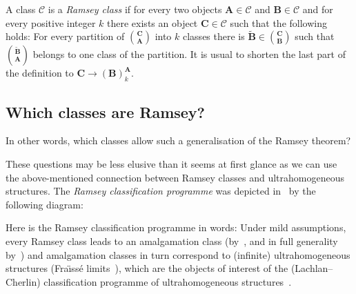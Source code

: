 \documentclass{elsarticle}
\def\str#1{\mathbf {#1}}
\def\Fraisse{Fra\"{\i}ss\' e}
\theoremstyle{plain}
\theoremstyle{definition}
\theoremstyle{remark}
\begin{document}
\medskip

A class $\mathcal C$ is a \emph{Ramsey class} if for every two objects $\str{A}\in \mathcal C$ and $\str{B}\in\mathcal C$ and for every positive integer $k$ there exists an object $\str{C}\in\mathcal C$ such that the following holds: For every partition of ${\str{C}\choose \str{A}}$ into $k$ classes there is $\widetilde{\str B} \in {\str{C}\choose \str{B}}$ such that ${\widetilde{\str{B}}\choose \str{A}}$ belongs to one class of the partition.  It is usual to shorten the last part of the definition to $\str{C} \longrightarrow (\str{B})^{\str{A}}_k$.

\subsection*{Which classes are Ramsey?}
In other words, which classes allow such a generalisation of the Ramsey theorem?

These questions may be less elusive than it seems at first glance as we can use the above-mentioned connection between Ramsey classes and ultrahomogeneous structures.
The \emph{Ramsey classification programme} was depicted in~\cite{Nevsetril2005} by the following diagram:

\begin{center}
\end{center}

Here is the Ramsey classification programme in words: Under mild assumptions, every Ramsey class leads to an amalgamation class (by~\cite{Nevsetvril1989a}, and in full generality by~\cite{Nevsetril2005,Kechris2005}) and amalgamation classes in turn correspond to (infinite) ultrahomogeneous structures (\Fraisse{} limits~\cite{Fraisse1953}), which are the objects of interest of the (Lachlan--Cherlin) classification programme of ultrahomogeneous structures~\cite{Lachlan1980,Cherlin1998,Cherlin2013}.
\end{document}
